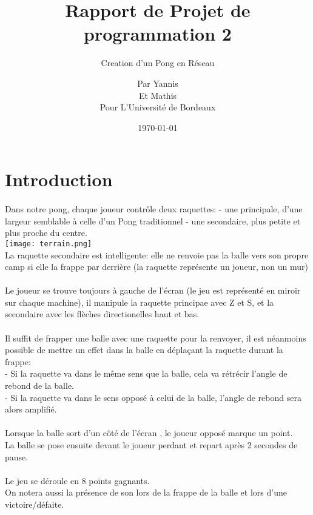 \documentclass[a4paper, 12pt]{scrreprt}
\title{Rapport de Projet de programmation 2}
\subtitle{Creation d'un Pong en Réseau}
\author{Par \bsc{Bendi-Ouis} Yannis \\
Et \bsc{Rade-Morzadec} Mathis \\
Pour L'Université de Bordeaux}
\date{\today}
\begin{document}
\maketitle

\section*{Introduction}
\paragraph{}
Dans notre pong, chaque joueur contrôle deux raquettes:
- une principale, d'une largeur semblable à celle d'un Pong traditionnel
- une secondaire, plus petite et plus proche du centre.
\\\texttt{[image: terrain.png]}
\\La raquette secondaire est intelligente: elle ne renvoie pas la balle vers son propre camp si elle la frappe par derrière (la raquette représente un joueur, non un mur)
\paragraph{}
Le joueur se trouve toujours à gauche de l'écran (le jeu est représenté en miroir sur chaque machine), il manipule la raquette principae avec Z et S, et la secondaire avec les flèches directionelles haut et bas.
\paragraph{}
Il suffit de frapper une balle avec une raquette pour la renvoyer, il est néanmoins possible de mettre un effet dans la balle en déplaçant la raquette durant la frappe:
\\- Si la raquette va dans le même sens que la balle, cela va rétrécir l'angle de rebond de la balle.
\\- Si la raquette va dans le sens opposé à celui de la balle, l'angle de rebond sera alors amplifié.

\paragraph{}
Lorsque la balle sort d'un côté de l'écran , le joueur opposé marque un point.
\\La balle se pose ensuite devant le joueur perdant et repart après 2 secondes de pause.
\paragraph{}
Le jeu se déroule en 8 points gagnants.
\\On notera aussi la présence de son lors de la frappe de la balle et lors d'une victoire/défaite.
\end{document}
